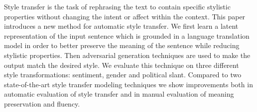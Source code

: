 Style transfer is the task of rephrasing the text to contain specific stylistic properties without changing the intent or affect within the context. This paper introduces a new method for automatic style transfer. We first learn a latent representation of the input sentence which is grounded in a language translation model in order to better preserve the meaning of the sentence while reducing stylistic properties. Then adversarial generation techniques are used to make the output match the desired style. We evaluate this technique on three different style transformations: sentiment, gender and political slant. Compared to two state-of-the-art style transfer modeling techniques we show improvements both in automatic evaluation of style transfer and in manual evaluation of meaning preservation and fluency.
